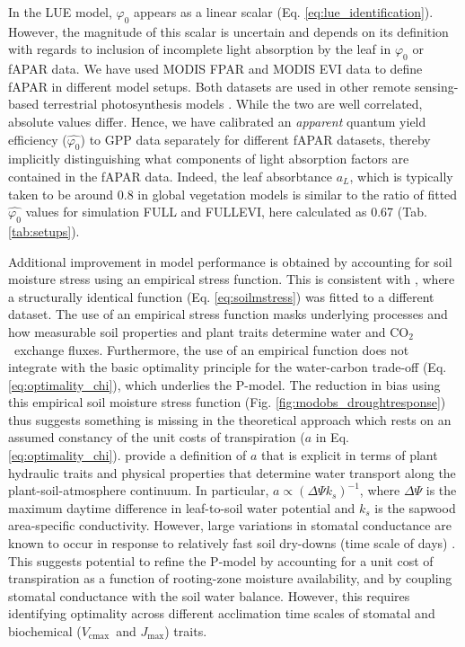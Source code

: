 \documentclass{myreport}
\newcommand{\coo}{CO$_2$}
\newcommand{\vcmax}{$V_{\text{cmax}}$}
\newcommand{\jmax}{$J_{\text{max}}$}
\begin{document}
In the LUE model, $\varphi_0$ appears as a linear scalar (Eq. \ref{eq:lue_identification}). However, the magnitude of this scalar is uncertain and depends on its definition with regards to inclusion of incomplete light absorption by the leaf in $\varphi_0$ or fAPAR data. We have used MODIS FPAR and MODIS EVI data to define fAPAR in different model setups. Both datasets are used in other remote sensing-based terrestrial photosynthesis models \citep{Zhang2017-yr, jiang16rse}. While the two are well correlated, absolute values differ. Hence, we have calibrated an \textit{apparent} quantum yield efficiency ($\widehat{\varphi_0}$) to GPP data separately for different fAPAR datasets, thereby implicitly distinguishing what components of light absorption factors are contained in the fAPAR data. Indeed, the leaf absorbtance $a_L$, which is typically taken to be around 0.8 in global vegetation models \citep{rogers17} is similar to the ratio of fitted $\widehat{\varphi_0}$ values for simulation FULL and FULL\textunderscore EVI, here calculated as 0.67 (Tab. \ref{tab:setups}).

Additional improvement in model performance is obtained by accounting for soil moisture stress using an empirical stress function. This is consistent with  \citet{stocker19natgeo}, where a structurally identical function (Eq. \ref{eq:soilmstress}) was fitted to a different dataset. The use of an empirical stress function masks underlying processes and how measurable soil properties and plant traits determine water and \coo\ exchange fluxes. Furthermore, the use of an empirical function does not integrate with the basic optimality principle for the water-carbon trade-off (Eq. \ref{eq:optimality_chi}), which underlies the P-model. The reduction in bias using this empirical soil moisture stress function (Fig. \ref{fig:modobs_droughtresponse}) thus suggests something is missing in the theoretical approach which rests on an assumed constancy of the unit costs of transpiration ($a$ in Eq. \ref{eq:optimality_chi}). \citet{prentice14ecollett} provide a definition of $a$ that is explicit in terms of plant hydraulic traits and physical properties that determine water transport along the plant-soil-atmosphere continuum. In particular, $a \propto ( \Delta \Psi k_s )^{-1}$, where $\Delta \Psi$ is the maximum daytime difference in leaf-to-soil water potential and $k_s$ is the sapwood area-specific conductivity. However, large variations in stomatal conductance are known to occur in response to relatively fast soil dry-downs (time scale of days) \citep{keenan10agrformet, egea11, stocker18newphyt}. This suggests potential to refine the P-model by accounting for a unit cost of transpiration as a function of rooting-zone moisture availability, and by coupling stomatal conductance with the soil water balance. However, this requires identifying optimality across different acclimation time scales of stomatal and biochemical (\vcmax\ and \jmax ) traits.
\end{document}
